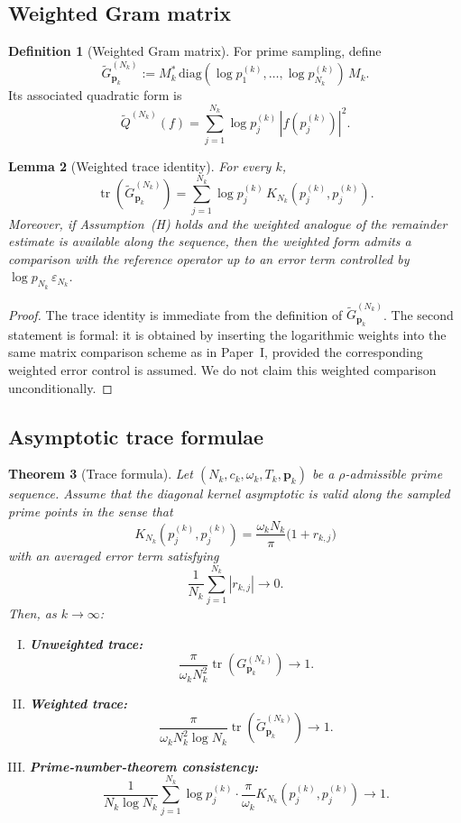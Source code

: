 \documentclass[12pt,a4paper]{amsart}
\newtheorem{theorem}{Theorem}[section]
\newtheorem{lemma}[theorem]{Lemma}
\theoremstyle{definition}
\newtheorem{definition}[theorem]{Definition}
\newcommand{\GVMk}{G^{(N_k)}_{\mathbf{p}_k}}
\newcommand{\GVMkw}{\widetilde{G}^{(N_k)}_{\mathbf{p}_k}}
\begin{document}
\subsection{Weighted Gram matrix}

\begin{definition}[Weighted Gram matrix]\label{def:weighted}
For prime sampling, define
\[
  \GVMkw:=M_k^*\,\mathrm{diag}(\log p_1^{(k)},\ldots,\log p_{N_k}^{(k)})\,M_k.
\]
Its associated quadratic form is
\[
  \widetilde Q^{(N_k)}(f)=\sum_{j=1}^{N_k}\log p_j^{(k)}\,|f(p_j^{(k)})|^2.
\]
\end{definition}

\begin{lemma}[Weighted trace identity]\label{lem:weighted}
For every $k$,
\[
  \operatorname{tr}(\GVMkw)
  =\sum_{j=1}^{N_k}\log p_j^{(k)}\,K_{N_k}(p_j^{(k)},p_j^{(k)}).
\]
Moreover, if Assumption~\textup{(H)} holds and the weighted analogue of the remainder
estimate is available along the sequence, then the weighted form admits a comparison
with the reference operator up to an error term controlled by $\log p_{N_k}\,\varepsilon_{N_k}$.
\end{lemma}

\begin{proof}
The trace identity is immediate from the definition of $\GVMkw$.
The second statement is formal: it is obtained by inserting the logarithmic weights into
the same matrix comparison scheme as in Paper~I, provided the corresponding weighted
error control is assumed.
We do not claim this weighted comparison unconditionally.
\end{proof}

\subsection{Asymptotic trace formulae}

\begin{theorem}[Trace formula]\label{thm:trace}
Let $(N_k,c_k,\omega_k,T_k,\mathbf p_k)$ be a $\rho$-admissible prime sequence.
Assume that the diagonal kernel asymptotic is valid along the sampled prime points in the sense that
\[
  K_{N_k}(p_j^{(k)},p_j^{(k)})
  =\frac{\omega_k N_k}{\pi}\bigl(1+r_{k,j}\bigr)
\]
with an averaged error term satisfying
\[
  \frac1{N_k}\sum_{j=1}^{N_k}|r_{k,j}|\to0.
\]
Then, as $k\to\infty$:
\begin{enumerate}[(I)]
\item \textbf{Unweighted trace:}
\[
  \frac{\pi}{\omega_kN_k^2}\operatorname{tr}(\GVMk)\to1.
\]
\item \textbf{Weighted trace:}
\[
  \frac{\pi}{\omega_kN_k^2\log N_k}\operatorname{tr}(\GVMkw)\to1.
\]
\item \textbf{Prime-number-theorem consistency:}
\[
  \frac{1}{N_k\log N_k}
  \sum_{j=1}^{N_k}\log p_j^{(k)}\cdot \frac{\pi}{\omega_k}K_{N_k}(p_j^{(k)},p_j^{(k)})
  \to1.
\]
\end{enumerate}
\end{theorem}
\end{document}
